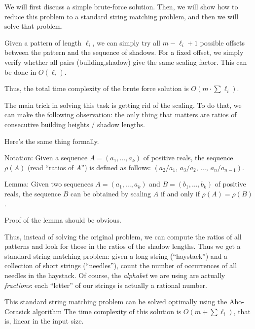 

We will first discuss a simple brute-force solution.
Then, we will show how to reduce this problem to a standard string matching problem,
and then we will solve that problem.


Given a pattern of length $\ell_i$, we can simply try all $m-\ell_i+1$ possible offsets
between the pattern and the sequence of shadows. For a fixed offset, we simply verify
whether all pairs (building,shadow) give the same scaling factor. This can be done
in $O(\ell_i)$.

Thus, the total time complexity of the brute force solution is $O(m\cdot\sum\ell_i)$.


The main trick in solving this task is getting rid of the scaling. To do that, we can
make the following observation: the only thing that matters are ratios of consecutive
building heights / shadow lengths.

\bigskip

Here's the same thing formally.

Notation: Given a sequence $A=(a_1,\dots,a_k)$ of positive reals, the sequence $\rho(A)$ 
(read ``ratios of $A$'') is defined as follows: $(a_2/a_1,\, a_3/a_2,\, \dots,\, a_n/a_{n-1})$.

Lemma: Given two sequences $A=(a_1,\dots,a_k)$ and $B=(b_1,\dots,b_k)$ of positive reals,
the sequence $B$ can be obtained by scaling $A$ if and only if $\rho(A)=\rho(B)$.

Proof of the lemma should be obvious.

\bigskip

Thus, instead of solving the original problem, we can compute the ratios of all patterns
and look for those in the ratios of the shadow lengths. Thus we get a standard string
matching problem: given a long string (``haystack'') and a collection of short strings
(``needles''), count the number of occurrences of all needles in the haystack.
Of course, the \emph{alphabet} we are using are actually \emph{fractions}: each 
``letter'' of our strings is actually a rational number.

This standard string matching problem can be solved optimally using the Aho-Corasick algorithm
The time complexity of this solution is $O(m + \sum\ell_i)$, that is, linear in the input size.

